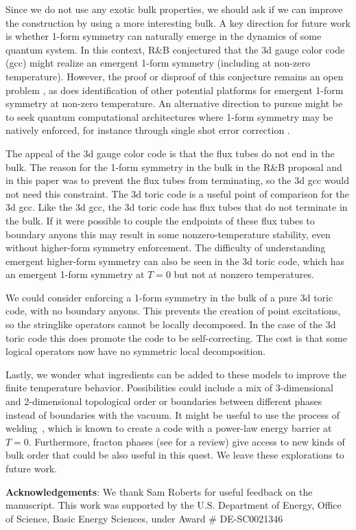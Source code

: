 \documentclass[twocolumn, longbibliography]{revtex4-2}
\begin{document}
Since we do not use any exotic bulk properties, we should ask if we can improve the construction by using a more interesting bulk.
A key direction for future work is  whether 1-form symmetry can naturally emerge in the dynamics of some quantum system. In this context, R\&B conjectured that the 3d gauge color code~\cite{BombinGauge} (gcc) might realize an emergent 1-form symmetry (including at non-zero temperature). However, the proof or disproof of this conjecture remains an open problem \cite{Kubica2018}, as does identification of other potential platforms for emergent 1-form symmetry at non-zero temperature. An alternative direction to pursue might be to seek quantum computational architectures where 1-form symmetry may be natively enforced, for instance through single shot error correction \cite{Roberts2017, BombinSingleShot}. 

The appeal of the 3d gauge color code is that the flux tubes do not end in the bulk.
The reason for the 1-form symmetry in the bulk in the R\&B proposal and in this paper was to prevent the flux tubes from terminating, so the 3d gcc would not need this constraint.
The 3d toric code is a useful point of comparison for the 3d gcc.
Like the 3d gcc, the 3d toric code has flux tubes that do not terminate in the bulk.
If it were possible to couple the endpoints of these flux tubes to boundary anyons this may result in some nonzero-temperature stability, even without higher-form symmetry enforcement. The difficulty of understanding emergent higher-form symmetry can also be seen in the 3d toric code, which has an emergent 1-form symmetry at $T=0$ but not at nonzero temperatures. 

We could consider enforcing a 1-form symmetry in the bulk of a pure 3d toric code, with no boundary anyons.
This prevents the creation of point excitations, so the stringlike operators cannot be locally decomposed. 
In the case of the 3d toric code this does promote the code to be self-correcting. The cost is that some logical operators now have no symmetric local decomposition. 

Lastly, we wonder what ingredients can be added to these models to improve the finite temperature behavior. Possibilities could include a mix of 3-dimensional and 2-dimensional topological order or boundaries between different phases instead of boundaries with the vacuum. It might be useful to use the process of welding~\cite{MichnickiPowerLaw}, which is known to create a code with a power-law energy barrier at $T=0$. Furthermore, fracton phases (see \cite{fractonarcmp} for a review) give access to new kinds of bulk order that could be also useful in this quest. We leave these explorations to future work. 

{\bf Acknowledgements}: We thank Sam Roberts for useful feedback on the manuscript. This work was supported by the U.S. Department of Energy, Office of Science, Basic Energy Sciences, under Award \# DE-SC0021346

\end{document}

